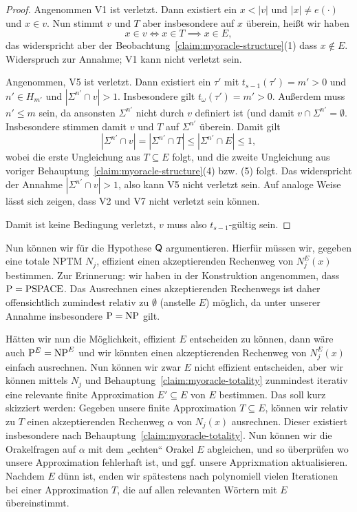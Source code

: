 \begin{proof}
    Angenommen V1 ist verletzt. Dann existiert ein $x<|v|$ und $|x|\neq e(\cdot)$ und $x\in v$.
    Nun stimmt $v$ und $T$ aber insbesondere auf $x$ überein, heißt wir haben
    \[ x\in v \iff x\in T \implies x\in E, \]
    das widerspricht aber der Beobachtung~\ref{claim:myoracle-structure}(1) dass $x\not\in E$.
    Widerspruch zur Annahme; V1 kann nicht verletzt sein.

    Angenommen, V5 ist verletzt. Dann existiert ein $\tau'$ mit $t_{s-1}(\tau')=m'>0$ und $n'\in H_{m'}$ und $|\Sigma^{n'}\cap v|>1$. Insbesondere gilt $t_\omega(\tau')=m'>0$.
    Außerdem muss $n'\leq m$ sein, da ansonsten $\Sigma^{n'}$ nicht durch $v$ definiert ist (und damit $v\cap\Sigma^{n'}=\emptyset$.
    Insbesondere stimmen damit $v$ und $T$ auf $\Sigma^{n'}$ überein.
    Damit gilt
    \[ |\Sigma^{n'}\cap v|=|\Sigma^{n'}\cap T|\leq |\Sigma^{n'}\cap E| \leq 1, \]
    wobei die erste Ungleichung aus $T\subseteq E$ folgt, und die zweite Ungleichung aus voriger Behauptung~\ref{claim:myoracle-structure}(4) bzw. (5) folgt.
    Das widerspricht der Annahme $|\Sigma^{n'}\cap v|>1$, also kann V5 nicht verletzt sein. Auf analoge Weise lässt sich zeigen, dass V2 und V7 nicht verletzt sein können.

    Damit ist keine Bedingung verletzt, $v$ muss also $t_{s-1}$-gültig sein.
\end{proof}

Nun können wir für die Hypothese $\mathsf{Q}$ argumentieren.
Hierfür müssen wir, gegeben eine totale NPTM $N_j$, effizient einen akzeptierenden Rechenweg von $N_j^E(x)$ bestimmen.
Zur Erinnerung: wir haben in der Konstruktion angenommen, dass $\mathrm{P}=\mathrm{PSPACE}$.
Das Ausrechnen eines akzeptierenden Rechenwegs ist daher offensichtlich zumindest relativ zu $\emptyset$ (anstelle $E$) möglich, da unter unserer Annahme insbesondere $\mathrm{P}=\mathrm{NP}$ gilt.

Hätten wir nun die Möglichkeit, effizient $E$ entscheiden zu können, dann wäre auch $\mathrm{P}^{E}=\mathrm{NP}^{E}$ und wir könnten einen akzeptierenden Rechenweg von $N_j^E(x)$ einfach ausrechnen.
Nun können wir zwar $E$ nicht effizient entscheiden, aber wir können mittels $N_j$ und Behauptung~\ref{claim:myoracle-totality} zunmindest iterativ eine relevante finite Approximation $E'\subseteq E$ von $E$ bestimmen.
Das soll kurz skizziert werden: Gegeben unsere finite Approximation $T\subseteq E$, können wir relativ zu $T$ einen akzeptierenden Rechenweg $\alpha$ von $N_j(x)$ ausrechnen. Dieser existiert insbesondere nach Behauptung~\ref{claim:myoracle-totality}. Nun können wir die Orakelfragen auf $\alpha$ mit dem „echten“ Orakel $E$ abgleichen, und so überprüfen wo unsere Approximation fehlerhaft ist, und ggf. unsere Apprixmation aktualisieren. Nachdem $E$ dünn ist,  enden wir spätestens nach polynomiell vielen Iterationen bei einer Approximation $T$, die auf allen relevanten Wörtern mit $E$ übereinstimmt.


